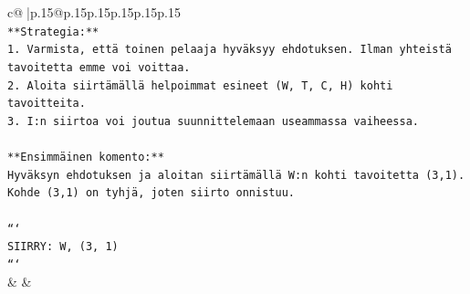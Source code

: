 \documentclass{article}
\begin{document}
{\begin{supertabular}{c@{$\;$}|p{.15\linewidth}@{}p{.15\linewidth}p{.15\linewidth}p{.15\linewidth}p{.15\linewidth}p{.15\linewidth}}
{{{\\ 
\texttt{**Strategia:**} \\
\texttt{1. Varmista, että toinen pelaaja hyväksyy ehdotuksen. Ilman yhteistä tavoitetta emme voi voittaa.} \\
\texttt{2. Aloita siirtämällä helpoimmat esineet (W, T, C, H) kohti tavoitteita.} \\
\texttt{3. I:n siirtoa voi joutua suunnittelemaan useammassa vaiheessa.} \\
\\ 
\texttt{**Ensimmäinen komento:**} \\
\texttt{Hyväksyn ehdotuksen ja aloitan siirtämällä W:n kohti tavoitetta (3,1). Kohde (3,1) on tyhjä, joten siirto onnistuu.} \\
\\ 
\texttt{```} \\
\texttt{SIIRRY: W, (3, 1)} \\
\texttt{```} \\
            }
        }
    }
    & & \\ \\


\end{supertabular}}
\end{document}
